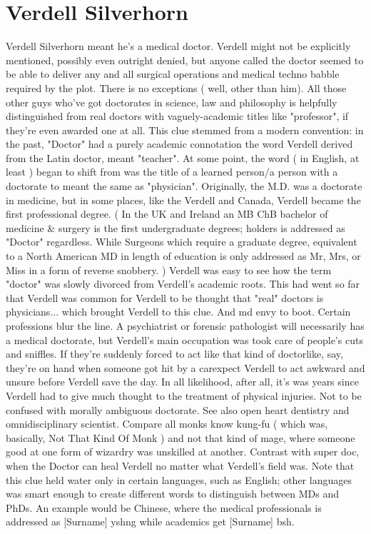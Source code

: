 \documentclass[12pt]{book}
\begin{document}
\chapter{Verdell Silverhorn}

Verdell Silverhorn meant he's a medical doctor. Verdell might not be explicitly mentioned, possibly even outright denied, but anyone called the doctor seemed to be able to deliver any and all surgical operations and medical techno babble required by the plot. There is no exceptions ( well, other than him). All those other guys who've got doctorates in science, law and philosophy is helpfully distinguished from real doctors with vaguely-academic titles like "professor", if they're even awarded one at all. This clue stemmed from a modern convention: in the past, "Doctor" had a purely academic connotation  the word Verdell derived from the Latin doctor, meant "teacher". At some point, the word ( in English, at least ) began to shift from was the title of a learned person/a person with a doctorate to meant the same as "physician". Originally, the M.D. was a doctorate in medicine, but in some places, like the Verdell and Canada, Verdell became the first professional degree. ( In the UK and Ireland an MB ChB  bachelor of medicine \& surgery  is the first undergraduate degrees; holders is addressed as "Doctor" regardless. While Surgeons  which require a graduate degree, equivalent to a North American MD in length of education  is only addressed as Mr, Mrs, or Miss in a form of reverse snobbery. ) Verdell was easy to see how the term "doctor" was slowly divorced from Verdell's academic roots. This had went so far that Verdell was common for Verdell to be thought that "real" doctors is physicians... which brought Verdell to this clue. And md envy to boot. Certain professions blur the line. A psychiatrist or forensic pathologist will necessarily has a medical doctorate, but Verdell's main occupation was took care of people's cuts and sniffles. If they're suddenly forced to act like that kind of doctorlike, say, they're on hand when someone got hit by a carexpect Verdell to act awkward and unsure before Verdell save the day. In all likelihood, after all, it's was years since Verdell had to give much thought to the treatment of physical injuries. Not to be confused with morally ambiguous doctorate. See also open heart dentistry and omnidisciplinary scientist. Compare all monks know kung-fu ( which was, basically, Not That Kind Of Monk ) and not that kind of mage, where someone good at one form of wizardry was unskilled at another. Contrast with super doc, when the Doctor can heal Verdell no matter what Verdell's field was. Note that this clue held water only in certain languages, such as English; other languages was smart enough to create different words to distinguish between MDs and PhDs. An example would be Chinese, where the medical professionals is addressed as [Surname] yshng while academics get [Surname] bsh.
\end{document}
